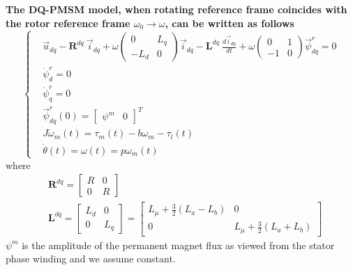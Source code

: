 \documentclass[12pt,a4paper]{scrartcl}
\begin{document}
\begin{onehalfspace}
\begin{mybox}
	\textbf{The DQ-PMSM model, when rotating reference frame coincides with the rotor reference frame $\omega_0 \rightarrow \omega$, can be written as follows}
	\begin{equation}\label{twophase_eq2}
		\left\lbrace \begin{aligned}
			& \vec{u}_{dq}-\mathbf{R}^{dq}\ \vec{i}_{dq} + \omega\begin{pmatrix} 0 & L_q\\ -L_d & 0 \end{pmatrix}\vec{i}_{dq} - \mathbf{L}^{dq}\ \frac{d\vec{i}_{dq}}{dt} + \omega\begin{pmatrix} 0 & 1\\-1 & 0 \end{pmatrix}\vec{\psi}_{dq}^r = 0\\[6pt]
			&\dot{\psi}_d^r = 0 \\[6pt]
			&\dot{\psi}_q^r = 0 \\[6pt]
			& \vec{\psi}^r_{dq}(0) = \begin{bmatrix} \psi^m &  0 \end{bmatrix}^T \\[6pt]
			& J\dot{\omega}_m(t) = \tau_m(t)-b{\omega}_m-\tau_l(t) \\[6pt]
			& \dot{\theta}(t) = \omega(t) = p\omega_m(t) 
		\end{aligned} \right. 
	\end{equation}
	where
	\begin{equation*}
		\begin{aligned}
			& \mathbf{R}^{dq} = 
			\begin{bmatrix} R &  0 \\
				0 & R
			\end{bmatrix} \\[6pt]
			& \mathbf{L}^{dq} = 
			\begin{bmatrix} L_d &  0 \\
				0 & L_q
			\end{bmatrix} =
			\begin{bmatrix} L_\mu+\frac{3}{2}(L_a-L_b) &  0 \\
				0 & L_\mu+\frac{3}{2}(L_a+L_b)
			\end{bmatrix}
		\end{aligned} 
	\end{equation*}
	$\psi^m$ is the amplitude of the permanent magnet flux as viewed from the stator phase winding and we assume constant.
\end{mybox}


\end{onehalfspace}
\end{document}
